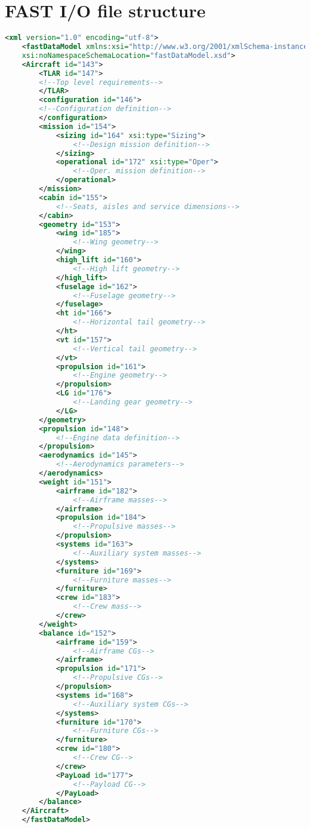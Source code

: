 \chapter{FAST I/O file structure}
\label{app:xml_file_struct}

\begin{mdframed}[hidealllines=true,backgroundcolor=lightgray!20]
	\begin{lstlisting}[label={lst:xml_struct},language=xml] 
	<xml version="1.0" encoding="utf-8">
	<fastDataModel xmlns:xsi="http://www.w3.org/2001/xmlSchema-instance" 
	xsi:noNamespaceSchemaLocation="fastDataModel.xsd">
	<Aircraft id="143">
		<TLAR id="147">
		<!--Top level requirements-->
		</TLAR>
		<configuration id="146">
		<!--Configuration definition-->
		</configuration>
		<mission id="154">
			<sizing id="164" xsi:type="Sizing">
				<!--Design mission definition-->
			</sizing>
			<operational id="172" xsi:type="Oper">
				<!--Oper. mission definition-->
			</operational>
		</mission>
		<cabin id="155">
			<!--Seats, aisles and service dimensions-->
		</cabin>
		<geometry id="153">
			<wing id="185">
				<!--Wing geometry-->
			</wing>
			<high_lift id="160">
				<!--High lift geometry-->
			</high_lift>
			<fuselage id="162">
				<!--Fuselage geometry-->
			</fuselage>
			<ht id="166">
				<!--Horizontal tail geometry-->
			</ht>
			<vt id="157">
				<!--Vertical tail geometry-->	
			</vt>
			<propulsion id="161">
				<!--Engine geometry-->
			</propulsion>
			<LG id="176">
				<!--Landing gear geometry-->
			</LG>
		</geometry>
		<propulsion id="148">
			<!--Engine data definition-->
		</propulsion>
		<aerodynamics id="145">
			<!--Aerodynamics parameters-->
		</aerodynamics>
		<weight id="151">
			<airframe id="182">
				<!--Airframe masses-->
			</airframe>
			<propulsion id="184">
				<!--Propulsive masses-->
			</propulsion>
			<systems id="163">
				<!--Auxiliary system masses-->
			</systems>
			<furniture id="169">
				<!--Furniture masses-->
			</furniture>
			<crew id="183">
				<!--Crew mass-->
			</crew>
		</weight>
		<balance id="152">
			<airframe id="159">
				<!--Airframe CGs-->
			</airframe>
			<propulsion id="171">
				<!--Propulsive CGs-->
			</propulsion>
			<systems id="168">
				<!--Auxiliary system CGs-->
			</systems>
			<furniture id="170">
				<!--Furniture CGs-->
			</furniture>
			<crew id="180">
				<!--Crew CG-->
			</crew>		
			<PayLoad id="177">	
				<!--Payload CG-->
			</PayLoad>	
		</balance>
	</Aircraft>
	</fastDataModel>
	\end{lstlisting}
\end{mdframed}